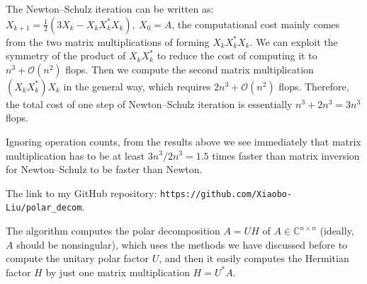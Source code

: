 \documentclass[12pt]{article}
\def\C{\mathbb{C}}
\def\nbyn{n \times n}
\begin{document}
The Newton--Schulz iteration can be written as: $X_{k+1}=\frac{1}{2}(3X_k-X_kX_k^*X_k),\ X_0=A$, the computational cost mainly comes from the two matrix multiplications of forming $X_kX_k^*X_k$. We can exploit the symmetry of the product of $X_kX_k^*$ to reduce the cost of computing it to $n^3+\mathcal{O}(n^2)$ flops. Then we compute the second matrix multiplication $(X_kX_k^*)X_k$ in the general way, which requires $2n^3+\mathcal{O}(n^2)$ flops. Therefore, the total cost of one step of Newton--Schulz iteration is essentially $n^3+2n^3=3n^3$ flops.

Ignoring operation counts, from the results above we see immediately that matrix multiplication has to be at least $3n^3/2n^3=1.5$ times faster than matrix inversion for Newton--Schulz to be faster than Newton.
 \vspace{.2cm}



 The link to my GitHub repository: \verb|https://github.com/Xiaobo-Liu/polar_decom|. 

The algorithm computes the polar decomposition $A = UH$ of $A\in\C^{\nbyn}$ (ideally, $A$ should be nonsingular), which uses the methods we have discussed before to compute the unitary polar factor $U$, and then it easily computes the Hermitian factor $H$ by just one matrix multiplication $H = U^*A$.
\end{document}
